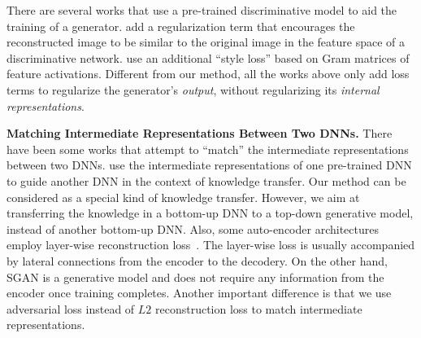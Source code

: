 \documentclass[10pt,twocolumn,letterpaper]{article}
\newcommand{\vpara}[1]{\vspace{0.1in}\noindent\textbf{#1}}
\begin{document}
There are several works that use a pre-trained discriminative model to aid the training of a generator. \cite{lamb2016discriminative, dosovitskiy2016generating} add a regularization term that encourages the reconstructed image to be similar to the original image in the feature space of a discriminative network. \cite{ulyanov2016texture,johnson2016perceptual} use an additional ``style loss'' based on Gram matrices of feature activations. Different from our method, all the works above only add loss terms to regularize the generator's \emph{output}, without regularizing its \emph{internal representations}. 

\vpara{Matching Intermediate Representations Between Two DNNs.} There have been some works that attempt to ``match'' the intermediate representations between two DNNs. \cite{romero2015fitnets, gupta2016cross} use the intermediate representations of one pre-trained DNN to guide another DNN in the context of knowledge transfer. 
Our method can be considered as a special kind of knowledge transfer. However, we aim at transferring the knowledge in a bottom-up DNN  to a top-down generative model, instead of another bottom-up DNN. 
Also, some auto-encoder architectures employ layer-wise reconstruction loss~\cite{valpola2015neural,rasmus2015semi,zhao2016stacked,2016-icml-recon-dec}. %
The layer-wise loss is usually accompanied by lateral connections from the encoder to the decodery. On the other hand, SGAN is a generative model and does not require any information from the encoder once training completes. Another important difference %
is that we use adversarial loss instead of $L2$ reconstruction loss to match intermediate representations. 

\end{document}
